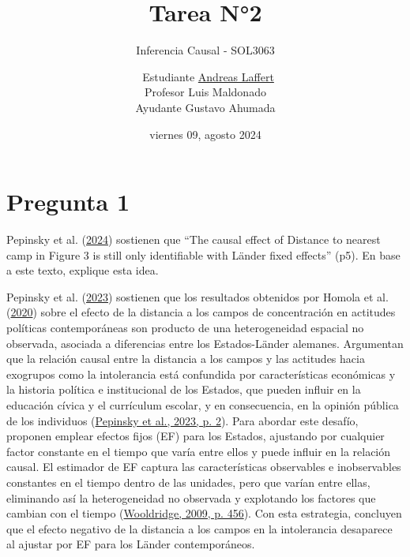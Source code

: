 \documentclass[
  12pt,
  a4paper,
]{article}
\title{\vspace{5cm} Tarea N°2}
\subtitle{Inferencia Causal - SOL3063}
\author{~Estudiante \href{mailto:alaffertt@estudiante.uc.cl}{Andreas Laffert}\\
\hspace*{0.333em}Profesor Luis Maldonado\\
Ayudante Gustavo Ahumada\\
\vspace{8cm}}
\date{viernes 09, agosto 2024}
\begin{document}
\maketitle

\pagebreak

\hypertarget{pregunta-1}{%
\section{Pregunta 1}\label{pregunta-1}}

Pepinsky et al. (\protect\hyperlink{ref-pepinsky_causation_2024}{2024}) sostienen que ``The causal effect of Distance to nearest camp in Figure 3 is still only identifiable with Länder fixed effects'' (p5). En base a este texto, explique esta idea.

Pepinsky et al. (\protect\hyperlink{ref-pepinsky_modeling_2023}{2023}) sostienen que los resultados obtenidos por Homola et al. (\protect\hyperlink{ref-homola_legacies_2020}{2020}) sobre el efecto de la distancia a los campos de concentración en actitudes políticas contemporáneas son producto de una heterogeneidad espacial no observada, asociada a diferencias entre los Estados-Länder alemanes. Argumentan que la relación causal entre la distancia a los campos y las actitudes hacia exogrupos como la intolerancia está confundida por características económicas y la historia política e institucional de los Estados, que pueden influir en la educación cívica y el currículum escolar, y en consecuencia, en la opinión pública de los individuos (\protect\hyperlink{ref-pepinsky_modeling_2023}{Pepinsky et al., 2023, p. 2}). Para abordar este desafío, proponen emplear efectos fijos (EF) para los Estados, ajustando por cualquier factor constante en el tiempo que varía entre ellos y puede influir en la relación causal. El estimador de EF captura las características observables e inobservables constantes en el tiempo dentro de las unidades, pero que varían entre ellas, eliminando así la heterogeneidad no observada y explotando los factores que cambian con el tiempo (\protect\hyperlink{ref-wooldridge_introductory_2009}{Wooldridge, 2009, p. 456}). Con esta estrategia, concluyen que el efecto negativo de la distancia a los campos en la intolerancia desaparece al ajustar por EF para los Länder contemporáneos.
\end{document}
